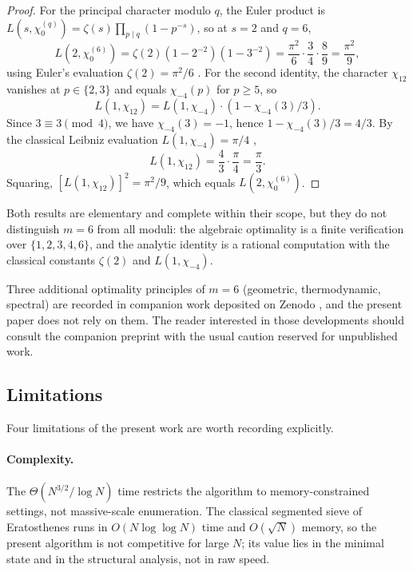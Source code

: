 \documentclass[11pt]{amsart}
\numberwithin{equation}{section}
\theoremstyle{plain}
\theoremstyle{definition}
\begin{document}
\begin{proof}
For the principal character modulo $q$, the Euler product is
$L(s,\chi_0^{(q)})=\zeta(s)\prod_{p\mid q}(1-p^{-s})$, so at $s=2$
and $q=6$,
\begin{equation*}
L(2,\chi_0^{(6)})=\zeta(2)(1-2^{-2})(1-3^{-2})
=\frac{\pi^2}{6}\cdot\frac{3}{4}\cdot\frac{8}{9}
=\frac{\pi^2}{9},
\end{equation*}
using Euler's evaluation $\zeta(2)=\pi^2/6$ \cite[Ch.~8]{Apostol1976}.
For the second identity, the character $\chi_{12}$ vanishes at
$p\in\{2,3\}$ and equals $\chi_{-4}(p)$ for $p\ge 5$, so
\begin{equation*}
L(1,\chi_{12})=L(1,\chi_{-4})\cdot(1-\chi_{-4}(3)/3).
\end{equation*}
Since $3\equiv 3\pmod 4$, we have $\chi_{-4}(3)=-1$, hence
$1-\chi_{-4}(3)/3=4/3$. By the classical Leibniz evaluation
$L(1,\chi_{-4})=\pi/4$ \cite[Ch.~4]{Davenport2000},
\begin{equation*}
L(1,\chi_{12})=\frac{4}{3}\cdot\frac{\pi}{4}=\frac{\pi}{3}.
\end{equation*}
Squaring, $[L(1,\chi_{12})]^2=\pi^2/9$, which equals
$L(2,\chi_0^{(6)})$.
\end{proof}

Both results are elementary and complete within their scope, but they
do not distinguish $m=6$ from all moduli: the algebraic optimality is
a finite verification over $\{1,2,3,4,6\}$, and the analytic identity
is a rational computation with the classical constants $\zeta(2)$ and
$L(1,\chi_{-4})$.

Three additional optimality principles of $m=6$ (geometric,
thermodynamic, spectral) are recorded in companion work deposited on
Zenodo \cite{PeinadorZ6UFP2026}, and the present paper does not rely
on them. The reader interested in those developments should consult
the companion preprint with the usual caution reserved for
unpublished work.

\subsection{Limitations}
\label{subsec:limitations}

Four limitations of the present work are worth recording explicitly.

\paragraph{Complexity.} The $\Theta(N^{3/2}/\log N)$ time restricts
the algorithm to memory-constrained settings, not massive-scale
enumeration. The classical segmented sieve of Eratosthenes runs in
$O(N\log\log N)$ time and $O(\sqrt{N})$ memory, so the present
algorithm is not competitive for large $N$; its value lies in the
minimal state and in the structural analysis, not in raw speed.
\end{document}
